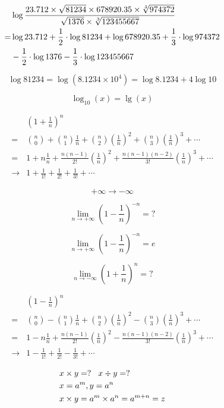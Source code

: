 \begin{align*}
& \log { 23.712  \times   \sqrt{81234}   \times  678920.35  \times  \sqrt[3]{974372}   
 \over {  \sqrt{1376}  \times   \sqrt[3]{123455667}  }}  \\
= & \log 23.712  +   \frac1 2 \cdot \log 81234   +  \log 678920.35  +  \frac 1 3 \cdot \log{974372} \\
& -  \frac 1 2 \cdot \log{1376}  -  \frac 1 3 \cdot \log {123455667} 
\end{align*}  

$$  \log81234  =  \log(8.1234 \times 10^4)  =   \log8.1234 + 4 \log10 $$

$$ \log_{10}(x) = \lg (x) $$ 

\begin{align*}
 & (1+\frac 1 n ) ^n  \\
 =  & \binom{n}{0}  + \binom{n}{1}  \frac 1 n + \binom{n}{2} (\frac 1 n)^2 + \binom{n}{3} (\frac 1 n)^3 + \cdots  \\
 =  & 1 + n \frac 1 n + \frac {n(n-1)}{2!}  (\frac 1 n)^2  +  \frac {n(n-1)(n-2)}{3!}  (\frac 1 n)^3 + \cdots  \\
 \rightarrow  & 1 + \frac{1}{1!}  + \frac{1}{2!}   + \frac{1}{3!}  + \cdots
 \end{align*}  


$$  +\infty   \rightarrow   -\infty  $$ 

$$  \lim_{n\rightarrow + \infty } (1-\frac 1 n ) ^{-n}    =  ?  $$

$$  \lim_{n\rightarrow + \infty } (1-\frac 1 n ) ^{-n}    =  e  $$


$$  \lim_{n\rightarrow - \infty } (1+ \frac 1 n ) ^{n}    =  ?  $$



\begin{align*}
 & (1-\frac 1 n ) ^n  \\
 =  & \binom{n}{0}  - \binom{n}{1}  \frac 1 n + \binom{n}{2} (\frac 1 n)^2 - \binom{n}{3} (\frac 1 n)^3 + \cdots  \\
 =  & 1 - n \frac 1 n + \frac {n(n-1)}{2!}  (\frac 1 n)^2  -  \frac {n(n-1)(n-2)}{3!}  (\frac 1 n)^3 + \cdots  \\
 \rightarrow  & 1 -\frac{1}{1!}  + \frac{1}{2!}   - \frac{1}{3!}  + \cdots
 \end{align*}  


\begin{align*}
& x  \times   y  = ? \hspace{0.3cm}  x  \div  y  = ? \\
& x  =  a^m ,     y =  a^n   \\
& x  \times  y  =  a^{m}   \times  a^{n}  = a^{m+n} = z
\end{align*}

